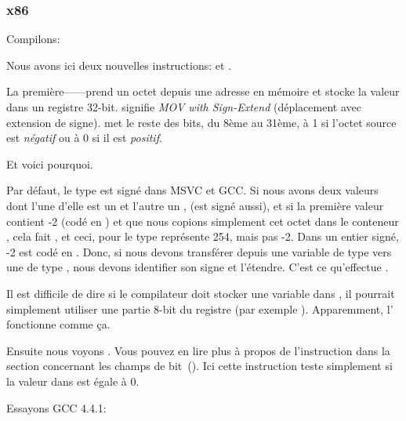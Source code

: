 \subsubsection{x86}


Compilons:




Nous avons ici deux nouvelles instructions: \MOVSX et \TEST.

\label{MOVSX}

La première---\MOVSX---prend un octet depuis une adresse en mémoire et stocke la
valeur dans un registre 32-bit. 
\MOVSX signifie \emph{MOV with Sign-Extend} (déplacement avec extension de signe).
\MOVSX met le reste des bits, du 8ème au 31ème, à 1 si l'octet source est \emph{négatif}
ou à 0 si il est \emph{positif}.

Et voici pourquoi.

Par défaut, le type \Tchar est signé dans MSVC et GCC. Si nous avons deux valeurs
dont l'une d'elle est un \Tchar et l'autre un \Tint, (\Tint est signé aussi), et
si la première valeur contient -2 (codé en ) et que nous copions simplement
cet octet dans le conteneur \Tint, cela fait , et ceci, pour le type
\Tint représente 254, mais pas -2. Dans un entier signé, -2 est codé en .
Donc, si nous devons transférer  depuis une variable de type \Tchar vers
une de type \Tint, nous devons identifier son signe et l'étendre. C'est ce qu'effectue
\MOVSX.

Il est difficile de dire si le compilateur doit stocker une variable \Tchar dans
\EDX, il pourrait simplement utiliser une partie 8-bit du registre (par exemple \DL).
Apparemment, l' fonctionne comme
ça.


Ensuite nous voyons .
Vous pouvez en lire plus à propos de l'instruction \TEST dans la section concernant
les champs de bit~().
Ici cette instruction teste simplement si la valeur dans \EDX est égale à 0.


Essayons GCC 4.4.1:



